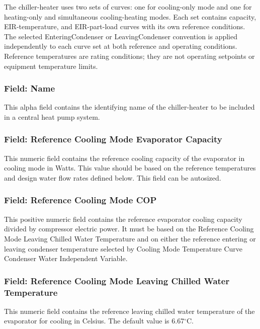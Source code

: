 The chiller-heater uses two sets of curves: one for cooling-only mode and one for heating-only and simultaneous cooling-heating modes. Each set contains capacity, EIR-temperature, and EIR-part-load curves with its own reference conditions. The selected EnteringCondenser or LeavingCondenser convention is applied independently to each curve set at both reference and operating conditions. Reference temperatures are rating conditions; they are not operating setpoints or equipment temperature limits.

\subsubsection{Field: Name}\label{field-name-19-002}

This alpha field contains the identifying name of the chiller-heater to be included in a central heat pump system.

\subsubsection{Field: Reference Cooling Mode Evaporator Capacity}\label{field-reference-cooling-mode-evaporator-capacity}

This numeric field contains the reference cooling capacity of the evaporator in cooling mode in Watts. This value should be based on the reference temperatures and design water flow rates defined below. This field can be autosized.

\subsubsection{Field: Reference Cooling Mode COP}\label{field-reference-cooling-mode-cop}

This positive numeric field contains the reference evaporator cooling capacity divided by compressor electric power. It must be based on the Reference Cooling Mode Leaving Chilled Water Temperature and on either the reference entering or leaving condenser temperature selected by Cooling Mode Temperature Curve Condenser Water Independent Variable.

\subsubsection{Field: Reference Cooling Mode Leaving Chilled Water Temperature}\label{field-reference-cooling-mode-leaving-chilled-water-temperature}

This numeric field contains the reference leaving chilled water temperature of the evaporator for cooling in Celsius. The default value is 6.67$^\circ$C.

